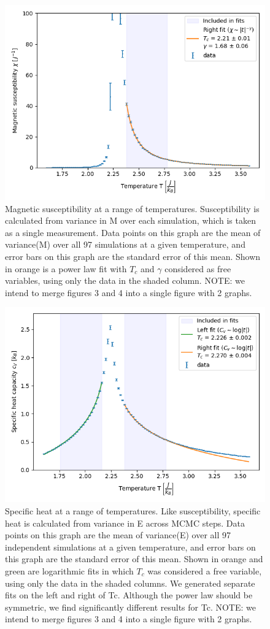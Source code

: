 \documentclass[letter,scriptaddress,twocolumn, prl]{revtex4}
\begin{document}
\begin{figure}[h]
	\begin{center}
		\includegraphics[width=.4\textwidth]{figs/fig3_chi.png}
		\caption{Magnetic susceptibility at a range of temperatures. Susceptibility is calculated from variance in M over each simulation, which is taken as a single measurement. Data points on this graph are the mean of variance(M) over all 97 simulations at a given temperature, and error bars on this graph are the standard error of this mean. Shown in orange is a power law fit with $T_c$ and $\gamma$ considered as free variables, using only the data in the shaded column. NOTE: we intend to merge figures 3 and 4 into a single figure with 2 graphs.}
		\label{fig:fig3a}
	\end{center}
\end{figure}
\begin{figure}[h]
	\begin{center}
		\includegraphics[width=.4\textwidth]{figs/fig3_cv.png}
		\caption{Specific heat at a range of temperatures. Like susceptibility, specific heat is calculated from variance in E across MCMC steps. Data points on this graph are the mean of variance(E) over all 97 independent simulations at a given temperature, and error bars on this graph are the standard error of this mean. Shown in orange and green are logarithmic fits in which $T_c$ was considered a free variable, using only the data in the shaded columns. We generated separate fits on the left and right of Tc. Although the power law should be symmetric, we find significantly different results for Tc. NOTE: we intend to merge figures 3 and 4 into a single figure with 2 graphs.}
		\label{fig:fig3b}
	\end{center}
\end{figure}
\end{document}
